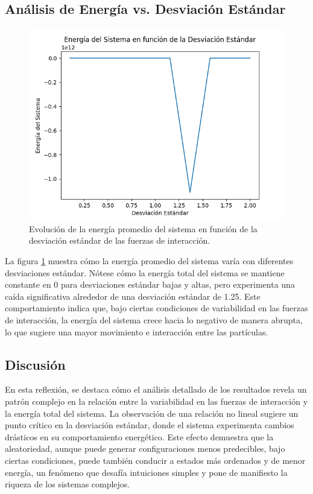 \begin{itemize}
\subsection{Análisis de Energía vs. Desviación Estándar}

\begin{figure}[ht!]
\centering
\includegraphics[width=0.8\linewidth]{./mnt/data/desviacion.png}
\caption{Evolución de la energía promedio del sistema en función de la desviación estándar de las fuerzas de interacción.}
\label{fig
}
\end{figure}

La figura \ref{fig
} muestra cómo la energía promedio del sistema varía con diferentes desviaciones estándar. Nótese cómo la energía total del sistema se mantiene constante en 0 para desviaciones estándar bajas y altas, pero experimenta una caída significativa alrededor de una desviación estándar de 1.25. Este comportamiento indica que, bajo ciertas condiciones de variabilidad en las fuerzas de interacción, la energía del sistema crece hacia lo negativo de manera abrupta, lo que sugiere una mayor movimiento e interacción entre las partículas.
\subsection{Discusión}

En esta reflexión, se destaca cómo el análisis detallado de los resultados revela un patrón complejo en la relación entre la variabilidad en las fuerzas de interacción y la energía total del sistema. La observación de una relación no lineal sugiere un punto crítico en la desviación estándar, donde el sistema experimenta cambios drásticos en su comportamiento energético. Este efecto demuestra que la aleatoriedad, aunque puede generar configuraciones menos predecibles, bajo ciertas condiciones, puede también conducir a estados más ordenados y de menor energía, un fenómeno que desafía intuiciones simples y pone de manifiesto la riqueza de los sistemas complejos.


\end{itemize}
